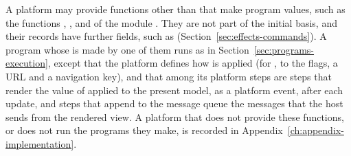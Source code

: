 A platform may provide functions other than  that make
program values, such as the functions , ,
 and  of the module . They are not part of the
initial basis, and their records have further fields, such as 
(Section~\ref{sec:effects-commands}). A program whose  is made by one
of them runs as in Section~\ref{sec:programs-execution}, except that the
platform defines how  is applied (for , to
the flags, a URL and a navigation key), and that among its platform steps are
steps that render the value of  applied to the present model, as a
platform event, after each update, and steps that append to the message
queue the messages that the host sends from the rendered view. %
A platform that does not provide these functions, or does not run the
programs they make, is recorded in Appendix~\ref{ch:appendix-implementation}.
